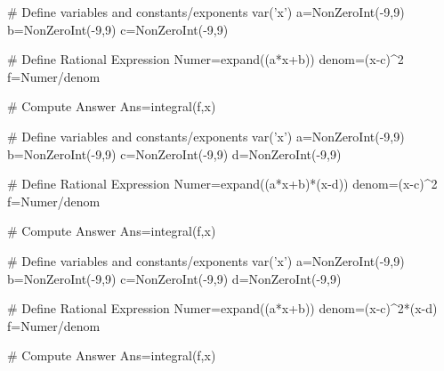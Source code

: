 \begin{sagesilent}
# Define variables and constants/exponents
var('x')
a=NonZeroInt(-9,9)
b=NonZeroInt(-9,9)
c=NonZeroInt(-9,9)

# Define Rational Expression
Numer=expand((a*x+b))
denom=(x-c)^2
f=Numer/denom

# Compute Answer
Ans=integral(f,x)
\end{sagesilent}



\begin{sagesilent}
# Define variables and constants/exponents
var('x')
a=NonZeroInt(-9,9)
b=NonZeroInt(-9,9)
c=NonZeroInt(-9,9)
d=NonZeroInt(-9,9)

# Define Rational Expression
Numer=expand((a*x+b)*(x-d))
denom=(x-c)^2
f=Numer/denom

# Compute Answer
Ans=integral(f,x)
\end{sagesilent}




\begin{sagesilent}
# Define variables and constants/exponents
var('x')
a=NonZeroInt(-9,9)
b=NonZeroInt(-9,9)
c=NonZeroInt(-9,9)
d=NonZeroInt(-9,9)

# Define Rational Expression
Numer=expand((a*x+b))
denom=(x-c)^2*(x-d)
f=Numer/denom

# Compute Answer
Ans=integral(f,x)
\end{sagesilent}

